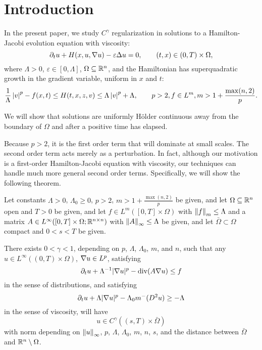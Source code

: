%

\section{Introduction}
In the present paper, we study $C^\gamma$ regularization in solutions to a Hamilton-Jacobi evolution equation with viscosity:
\[ \partial_t u + H(x,u,\nabla u) - \varepsilon \Delta u = 0, \qquad (t,x)\in (0,T)\times\Omega, \]
where $\Lambda > 0$, $\varepsilon \in [0,\Lambda]$, $\Omega \subseteq \mathbb{R}^n$, and the Hamiltonian has superquadratic growth in the gradient variable, uniform in $x$ and $t$:
\[ \frac{1}{\Lambda} \left\lvert v \right\rvert^p - f(x,t) \leq H(t,x,z,v) \leq \Lambda \left\lvert v \right\rvert^p + \Lambda, \qquad p>2, f \in L^m, m > 1+ \frac{\max(n,2)}{p}.\]

We will show that solutions are uniformly H\"{o}lder continuous away from the boundary of $\Omega$ and after a positive time has elapsed.  

Because $p>2$, it is the first order term that will dominate at small scales.  The second order term acts merely as a perturbation.  In fact, although our motivation is a first-order Hamilton-Jacobi equation with viscosity, our techniques can handle much more general second order terms.  Specifically, we will show the following theorem.  
%
\begin{theorem} \label{th:main}
Let constants $\Lambda > 0$, $\Lambda_0 \geq 0$, $p>2$, $m > 1+\frac{\max(n,2)}{p}$ be given, and let $\Omega \subseteq \mathbb{R}^n$ open and $T>0$ be given, and let $f \in L^m([0,T]\times \Omega)$ with $\left\lVert f\right\rVert_m \leq \Lambda$ and a matrix $A \in L^\infty([0,T]\times\Omega;\mathbb{R}^{n\times n})$ with $\left\lVert A\right\rVert_\infty \leq \Lambda$ be given, and let $\bar{\Omega} \subset \Omega$ compact and $0 < s < T$ be given.  

There exists $0<\gamma<1$, depending on $p$, $\Lambda$, $\Lambda_0$, $m$, and $n$, such that any $u \in L^\infty((0,T)\times\Omega)$, $\nabla u \in L^p$, satisfying 
\begin{equation} \label{eq:mainPDEdist}
\partial_t u + \Lambda^{-1} |\nabla u|^p - \operatorname{div} (A \nabla u) \leq f
\end{equation} 
in the sense of distributions, and satisfying 
\begin{equation} \label{eq:basePDEvisc}
\partial_t u + \Lambda |\nabla u|^p - \Lambda_0 m^-(D^2 u) \geq -\Lambda
\end{equation}
in the sense of viscosity, will have
\[ u \in C^\gamma((s,T)\times\bar{\Omega})\]
with norm depending on $\left\lVert u\right\rVert_\infty$, $p$, $\Lambda$, $\Lambda_0$, $m$, $n$, $s$, and the distance between $\bar{\Omega}$ and $\mathbb{R}^n \setminus \Omega$.  
\end{theorem}


